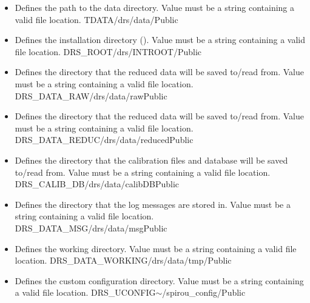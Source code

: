 \begin{itemize}

\item {} 
{Defines the path to the data directory. Value must be a string containing a valid file location.}
{TDATA}{/drs/data/}{\AllRecipes}{\configtxtfile}{\spirouConst}{Public}

\item {} 
{Defines the installation directory (\InstallDIR). Value must be a string containing a valid file location.}
{DRS\_ROOT}{/drs/INTROOT/}{\AllRecipes}{\configtxtfile}{\spirouConst}{Public}

\item {} 
{Defines the directory that the reduced data will be saved to/read from. Value must be a string containing a valid file location.}
{DRS\_DATA\_RAW}{/drs/data/raw}{\AllRecipes}{\configtxtfile}{\spirouConst}{Public}

\item {} 
{Defines the directory that the reduced data will be saved to/read from. Value must be a string containing a valid file location.}
{DRS\_DATA\_REDUC}{/drs/data/reduced}{\AllRecipes}{\configtxtfile}{\spirouConst}{Public}

\item {} 
{Defines the directory that the calibration files and database will be saved to/read from. Value must be a string containing a valid file location.}
{DRS\_CALIB\_DB}{/drs/data/calibDB}{\AllRecipes}{\configtxtfile}{\spirouConst}{Public}

\item {} 
{Defines the directory that the log messages are stored in. Value must be a string containing a valid file location.}
{DRS\_DATA\_MSG}{/drs/data/msg}{\AllRecipes}{\configtxtfile}{\spirouConst}{Public}

\item {} 
{Defines the working directory. Value must be a string containing a valid file location.}
{DRS\_DATA\_WORKING}{/drs/data/tmp/}{\AllRecipes}{\configtxtfile}{\spirouConst}{Public}

\item {} 
{Defines the custom configuration directory. Value must be a string containing a valid file location.}
{DRS\_UCONFIG}{$\sim$/spirou\_config/}{\AllRecipes}{\configtxtfile}{\spirouConst}{Public}

\end{itemize}


